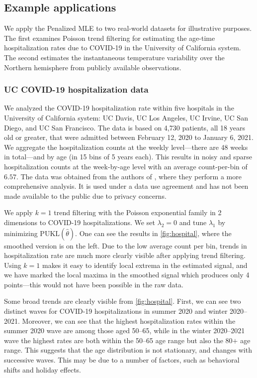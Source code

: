 \documentclass[ejs,noshowframe]{imsart}
\theoremstyle{plain}
\theoremstyle{definition}
\renewcommand{\hat}{\widehat}
\begin{document}
\subsection{Example applications}
\label{sec:example-applications}

We apply the Penalized MLE to two real-world datasets for illustrative purposes.
The first examines Poisson trend filtering for estimating the age-time
hospitalization rates due to COVID-19 in the University of California system.
The second estimates the instantaneous temperature variability over the Northern
hemisphere from publicly available observations.

\subsubsection{UC COVID-19 hospitalization data}
\label{sec:hospital-data}

We analyzed the COVID-19 hospitalization rate within five hospitals in the
University of California system: UC Davis, UC Los Angeles, UC Irvine, UC San
Diego, and UC San Francisco. 
The data is based on 4,730 patients, all 18 years old or greater, that were
admitted between February 12, 2020 to January 6, 2021. 
We aggregate the hospitalization counts at the weekly level---there are 48 weeks
in total---and by age (in 15 bins of 5 years each). 
This results in noisy and sparse hospitalization counts at the week-by-age
level with an average count-per-bin of $6.57$.  
The data was obtained from the authors of \cite{nuno2021covid}, where they
perform a more comprehensive analysis. 
It is used under a data use agreement and has not been made available to the
public due to privacy concerns.

We apply $k=1$ trend filtering with the Poisson exponential family in 2
dimensions to COVID-19 hospitalizations. 
We set $\lambda_2=0$ and tune $\lambda_1$ by minimizing $\mathrm{PUKL}(\hat\theta)$.
One can see the results in \autoref{fig:hospital}, where the smoothed version
is on the left. 
Due to the low average count per bin, trends in hospitalization rate are much
more clearly visible after applying trend filtering. 
Using $k=1$ makes it easy to 
identify local extrema in the estimated signal, and we have marked the local maxima in the smoothed signal which produces only 4 
points---this would not have been possible in the raw data.

Some broad trends are clearly visible from \autoref{fig:hospital}.
First, we can see two distinct waves for COVID-19 hospitalizations in
summer 2020 and winter 2020--2021.   
Moreover, we can see that the highest hospitalization rates within the summer
2020 wave are among those aged 50--65, while in the winter 2020--2021 wave the
highest rates are both within the 50--65 age range but also the 80$+$ age 
range. 
This suggests that the age distribution is not stationary, and changes with
successive waves. 
This may be due to a number of factors, such as behavioral shifts and holiday 
effects.
\end{document}
